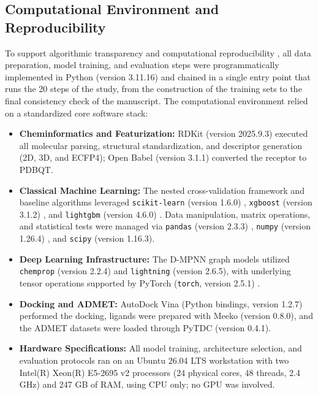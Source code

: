 
\subsection{Computational Environment and Reproducibility}

To support algorithmic transparency and computational reproducibility \cite{rojas2026}, all data preparation, model training, and evaluation steps were programmatically implemented in Python (version 3.11.16) and chained in a single entry point that runs the 20 steps of the study, from the construction of the training sets to the final consistency check of the manuscript. The computational environment relied on a standardized core software stack:

\begin{itemize}
	\item \textbf{Cheminformatics and Featurization:} RDKit (version 2025.9.3) \cite{landrum2025} executed all molecular parsing, structural standardization, and descriptor generation (2D, 3D, and ECFP4); Open Babel (version 3.1.1) \cite{babel2011} converted the receptor to PDBQT.
	\item \textbf{Classical Machine Learning:} The nested cross-validation framework \cite{krstajic2014, calle2025} and baseline algorithms leveraged \texttt{scikit-learn} (version 1.6.0) \cite{pedregosa2011sklearn}, \texttt{xgboost} (version 3.1.2) \cite{chengeustrin2016XGBoost}, and \texttt{lightgbm} (version 4.6.0) \cite{kemeng2017LightGBM}. Data manipulation, matrix operations, and statistical tests were managed via \texttt{pandas} (version 2.3.3) \cite{mckinney2010pandas}, \texttt{numpy} (version 1.26.4) \cite{harris2020numpy}, and \texttt{scipy} (version 1.16.3).
	\item \textbf{Deep Learning Infrastructure:} The D-MPNN graph models utilized \texttt{chemprop} (version 2.2.4) \cite{graff2026, heid2024} and \texttt{lightning} (version 2.6.5), with underlying tensor operations supported by PyTorch (\texttt{torch}, version 2.5.1) \cite{paszke2019pytorch}.
	\item \textbf{Docking and ADMET:} AutoDock Vina (Python bindings, version 1.2.7) \cite{trott2009} performed the docking, ligands were prepared with Meeko (version 0.8.0), and the ADMET datasets were loaded through PyTDC (version 0.4.1).
	\item \textbf{Hardware Specifications:} All model training, architecture selection, and evaluation protocols ran on an Ubuntu 26.04 LTS workstation with two Intel(R) Xeon(R) E5-2695 v2 processors (24 physical cores, 48 threads, 2.4 GHz) and 247 GB of RAM, using CPU only; no GPU was involved.
\end{itemize}

